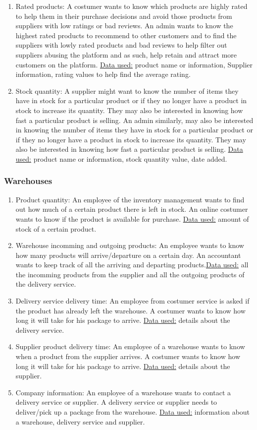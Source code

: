 \documentclass{article}
\begin{document}
\begin{enumerate}
  \item Rated products: A costumer wants to know which products are highly rated to help them in their purchase decisions and avoid those products from suppliers with low ratings or bad reviews. An admin wants to know the highest rated products to recommend to other customers and to find the suppliers with lowly rated products and bad reviews to help filter out suppliers abusing the platform and as such, help retain and attract more customers on the platform.  \underline{Data used:} product name or information, Supplier information, rating values to help find the average rating.
  \item Stock quantity: A supplier might want to know the number of items they have in stock for a particular product or if they no longer have a product in stock to increase its quantity. They may also be interested in knowing how fast a particular product is selling. An admin similarly, may also be interested in knowing the number of items they have in stock for a particular product or if they no longer have a product in stock to increase its quantity. They may also be interested in knowing how fast a particular product is selling. \underline{Data used:} product name or information, stock quantity value, date added.
\end{enumerate}

\subsubsection{Warehouses}
\begin{enumerate}
  \item Product quantity: An employee of the inventory management wants to find out how much of a certain product there is left in stock. An online costumer wants to know if the product is available for purchase. \underline{Data used:} amount of stock of a certain product.
  \item Warehouse incomming and outgoing products: An employee wants to know how many products will arrive/departure on a certain day. An accountant wants to keep track of all the arriving and departing products.\underline{Data used:} all the incomming products from the supplier and all the outgoing products of the delivery service.
  \item Delivery service delivery time: An employee from costumer service is asked if the product has already left the warehouse. A costumer wants to know how long it will take for his package to arrive.
  \underline{Data used:} details about the delivery service.
  \item Supplier product delivery time: An employee of a warehouse wants to know when a product from the supplier arrives. A costumer wants to know how long it will take for his package to arrive.
  \underline{Data used:} details about the supplier.
  \item Company information: An employee of a warehouse wants to contact a delivery service or supplier. A delivery service or supplier needs to deliver/pick up a package from the warehouse.
  \underline{Data used:} information about a warehouse, delivery service and supplier.
\end{enumerate}
\end{document}
